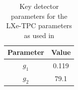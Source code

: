 \begin{table}[]
    \centering
    \begin{tabular}{c|c}
        Parameter   & Value  \\ \hline
        $g_{1}$     & 0.119 \\
        $g_{2}$     & 79.1  
    \end{tabular}
    \caption{Key detector parameters for the LXe-TPC parameters as used in \cite{LZ_projected_sensitivity_paper_ref}}
    \label{tab:projected_sensitivity_detector_parameters}
\end{table}

\fi